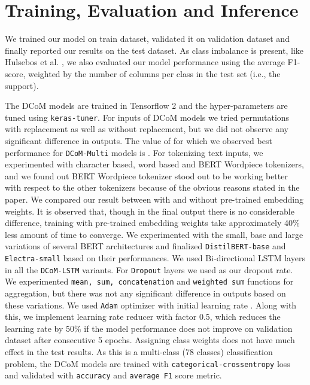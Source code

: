 \documentclass{article}
\begin{document}
\section{Training, Evaluation and Inference}
\label{sec:training}

We trained our model on train dataset, validated it on validation dataset and finally reported our results on the test dataset. As class imbalance is present, like Hulsebos et al. \cite{Hulsebos}, we also evaluated our model performance using the average F1-score, weighted by the number of columns per class in the test set (i.e., the support). 

The DCoM models are trained in Tensorflow 2 \cite{tensorflow2015-whitepaper} and the hyper-parameters are tuned using \texttt{keras-tuner}\cite{kerastuner}. For inputs of DCoM models we tried permutations with replacement as well as without replacement, but we did not observe any significant difference in outputs. The value of  for which we observed best performance for \texttt{DCoM-Multi} models is . For tokenizing text inputs, we experimented with character based, word based and BERT Wordpiece\cite{wordpiece} tokenizers, and we found out BERT Wordpiece tokenizer stood out to be working better with respect to the other tokenizers because of the obvious reasons stated in the paper\cite{wordpiece}. We compared our result between with and without pre-trained embedding weights. It is observed that, though in the final output there is no considerable difference, training with pre-trained embedding weights take approximately 40\% less amount of time to converge. We experimented with the small, base and large variations of several BERT architectures and finalized \texttt{DistilBERT-base}\cite{distilbert} and \texttt{Electra-small}\cite{electra} based on their performances. We used Bi-directional LSTM layers in all the \texttt{DCoM-LSTM} variants. For \texttt{Dropout} layers we used  as our dropout rate. We experimented \texttt{mean, sum, concatenation} and \texttt{weighted sum} functions for aggregation, but there was not any significant difference in outputs based on these variations. We used \texttt{Adam}\cite{adam} optimizer with initial learning rate . Along with this, we implement learning rate reducer with factor 0.5, which reduces the learning rate by 50\% if the model performance does not improve on validation dataset after consecutive 5 epochs. Assigning class weights does not have much effect in the test results. As this is a multi-class (78 classes) classification problem, the DCoM models are trained with \texttt{categorical-crossentropy} loss and validated with \texttt{accuracy} and \texttt{average F1} score metric.
\end{document}
